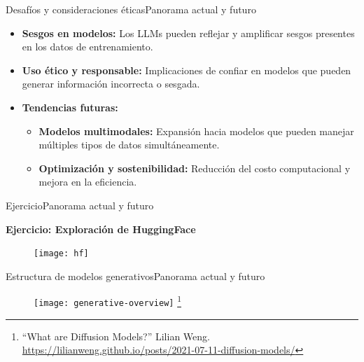 \documentclass[10pt,border=3pt,tikz]{beamer}
\begin{document}
    \begin{frame}{Desafíos y consideraciones éticas}{Panorama actual y futuro}
        \begin{itemize}
            \item \textbf{Sesgos en modelos:} Los LLMs pueden reflejar y amplificar sesgos presentes en los datos de entrenamiento.
            \item \textbf{Uso ético y responsable:} Implicaciones de confiar en modelos que pueden generar información incorrecta o sesgada.
            \item \textbf{Tendencias futuras:}
            \begin{itemize}
                \item \textbf{Modelos multimodales:} Expansión hacia modelos que pueden manejar múltiples tipos de datos simultáneamente.
                \item \textbf{Optimización y sostenibilidad:} Reducción del costo computacional y mejora en la eficiencia.
            \end{itemize}
        \end{itemize}
    \end{frame}
    
    \begin{frame}{Ejercicio}{Panorama actual y futuro}
        \begin{center}
            {\Large \textbf{Ejercicio: Exploración de HuggingFace}}
        \end{center}
        \begin{figure}
            \centering
            \texttt{[image: hf]}
        \end{figure}
    \end{frame}
    
    \begin{frame}{Estructura de modelos generativos}{Panorama actual y futuro}
        \begin{figure}
            \centering
            \texttt{[image: generative-overview]}
            \let\thefootnote\relax\footnote{{\tiny “What are Diffusion Models?” Lilian Weng. \url{https://lilianweng.github.io/posts/2021-07-11-diffusion-models/}}}
        \end{figure}
    \end{frame}
    
\end{document}
